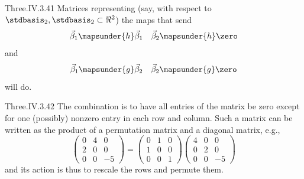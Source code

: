 \begin{ans}{Three.IV.3.41}
      Matrices representing (say, with respect to
      \( \stdbasis_2,\stdbasis_2\subset\Re^2 \)) the maps that send
      \begin{equation*}
        \vec{\beta}_1 \mapsunder{h} \vec{\beta}_1
        \quad
        \vec{\beta}_2 \mapsunder{h} \zero
      \end{equation*}
      and
      \begin{equation*}
        \vec{\beta}_1 \mapsunder{g} \vec{\beta}_2
        \quad
        \vec{\beta}_2 \mapsunder{g} \zero
      \end{equation*}
      will do.
    
\end{ans}
\begin{ans}{Three.IV.3.42}
      The combination is to have all entries of the matrix be zero
      except for one (possibly) nonzero entry in each row and column.
      Such a matrix can be written as the product of a permutation matrix and
      a diagonal matrix, e.g.,
      \begin{equation*}
        \begin{pmatrix}
          0  &4  &0  \\
          2  &0  &0  \\
          0  &0  &-5
        \end{pmatrix}
        =\begin{pmatrix}
          0  &1  &0  \\
          1  &0  &0  \\
          0  &0  &1
        \end{pmatrix}
        \begin{pmatrix}
          4  &0  &0  \\
          0  &2  &0  \\
          0  &0  &-5
        \end{pmatrix}
      \end{equation*}
      and its action is thus to rescale the rows and permute them.
    
\end{ans}
